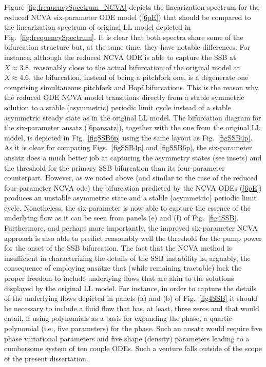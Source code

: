 Figure \ref{fig:frequencySpectrum_NCVA} depicts the linearization
spectrum for the reduced NCVA six-parameter ODE model (\ref{6pE}) that 
should be compared to the linearization spectrum of original LL model
depicted in Fig.~\ref{fig:frequencySpectrum}.
%
It is clear that both spectra share some of the bifurcation structure 
but, at the same time, they have notable differences.
%
For instance, although the reduced NCVA ODE is able to capture
the SSB at $X\approx 3.8$, reasonably close to the actual bifurcation 
of the original model at $X\approx 4.6$, the bifurcation, instead of
being a pitchfork one, is a degenerate one comprising simultaneous 
pitchfork and Hopf bifurcations.
%
This is the reason why the reduced ODE NCVA model transitions directly
from a stable symmetric solution to a stable (asymmetric) periodic 
limit cycle instead of a stable asymmetric steady state as in 
the original LL model.
%
The bifurcation diagram for the six-parameter ansatz (\ref{6pansatz}),
together with the one from the original LL model, is depicted in 
Fig.~\ref{figSSB6p} using the same layout as Fig.~\ref{figSSB4p}.  
%
As it is clear for comparing Figs.~\ref{figSSB4p} and \ref{figSSB6p},
the six-parameter ansatz does a much better job at capturing the
asymmetry states (see insets) and the threshold for the primary
SSB bifurcation than its four-parameter counterpart.
%
However, as we noted above (and similar to the case of the reduced 
four-parameter NCVA ode) the bifurcation predicted by
the NCVA ODEs (\ref{6pE}) produces an unstable asymmetric state
and a stable (asymmetric) periodic limit cycle.
%
Nonetheless, the six-parameter is now able to capture the essence 
of the underlying flow as it can be seen from panels (e) and (f)
of Fig.~\ref{fig4SSB}.
%
Furthermore, and perhaps more importantly, the improved six-parameter 
NCVA approach is also able to predict reasonably well the threshold 
for the pump power for the onset of the SSB bifurcation.
%
The fact that the NCVA method is insufficient in characterizing the
details of the SSB instability is, arguably, 
the consequence of employing ans\"atze 
that (while remaining tractable) 
lack the proper freedom to include underlying flows that are
akin to the solutions displayed by the original LL model.
%
For instance, in order to capture the details of the underlying flows
depicted in panels (a) and (b) of Fig.~\ref{fig4SSB} it should be
necessary to include a fluid flow that has, at least, three
zeros and that would entail, if using polynomials as a basis
for expanding the phase, a quartic polynomial (i.e., five
parameters) for the phase.
%
Such an ansatz would require five phase variational parameters
and five shape (density) parameters leading to a cumbersome system
of ten couple ODEs. Such a venture falls outside of the scope
of the present dissertation.
%

